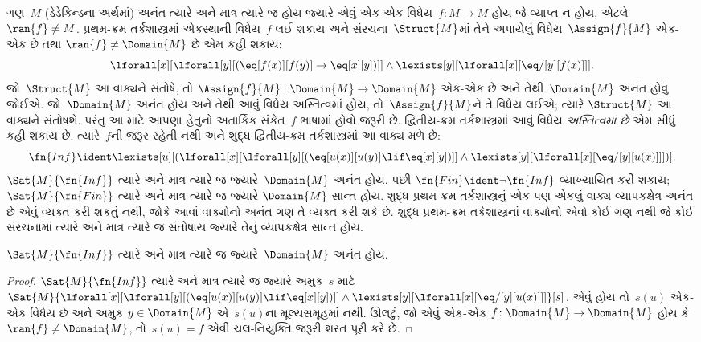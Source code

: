 ગણ~$M$ (ડેડેકિન્ડના અર્થમાં) અનંત ત્યારે અને માત્ર ત્યારે જ હોય જ્યારે
એવું એક-એક વિધેય~$f\colon M
\to M$ હોય જે વ્યાપ્ત ન હોય, એટલે $\ran{f} \neq M$. પ્રથમ-ક્રમ
તર્કશાસ્ત્રમાં એકસ્થાની વિધેય~$f$ લઈ શકાય અને
સંરચના~$\Struct{M}$માં તેને અપાયેલું વિધેય~$\Assign{f}{M}$
એક-એક છે તથા $\ran{f} \neq
\Domain{M}$ છે એમ કહી શકાય:
\[
\lforall[x][\lforall[y][(\eq[f(x)][f(y)] \to \eq[x][y])]] \land
\lexists[y][\lforall[x][\eq/[y][f(x)]]].
\]
જો~$\Struct{M}$ આ વાક્યને સંતોષે, તો
$\Assign{f}{M}:
\Domain{M} \to \Domain{M}$ એક-એક છે અને તેથી~$\Domain{M}$
અનંત હોવું જોઈએ. જો~$\Domain{M}$ અનંત હોય અને તેથી આવું વિધેય
અસ્તિત્વમાં હોય, તો~$\Assign{f}{M}$ને તે વિધેય લઈએ; ત્યારે
$\Struct{M}$ આ વાક્યને સંતોષશે. પરંતુ આ માટે આપણા હેતુનો
અતાર્કિક સંકેત~$f$ ભાષામાં હોવો જરૂરી છે. દ્વિતીય-ક્રમ તર્કશાસ્ત્રમાં
આવું વિધેય \emph{અસ્તિત્વમાં છે} એમ સીધું કહી શકાય છે. ત્યારે~$f$ની
જરૂર રહેતી નથી અને શુદ્ધ દ્વિતીય-ક્રમ તર્કશાસ્ત્રમાં આ વાક્ય
મળે છે:
\[
\fn{Inf} \ident \lexists[u][(\lforall[x][\lforall[y][(\eq[u(x)][u(y)]
      \lif \eq[x][y])]] \land \lexists[y][\lforall[x][\eq/[y][u(x)]]])].
\]
$\Sat{M}{\fn{Inf}}$ ત્યારે અને માત્ર ત્યારે જ જ્યારે~$\Domain{M}$
અનંત હોય. પછી $\fn{Fin} \ident \lnot \fn{Inf}$ વ્યાખ્યાયિત કરી
શકાય; $\Sat{M}{\fn{Fin}}$ ત્યારે અને માત્ર ત્યારે જ જ્યારે
$\Domain{M}$ સાન્ત હોય. શુદ્ધ પ્રથમ-ક્રમ તર્કશાસ્ત્રનું એક પણ એકલું
વાક્ય વ્યાપકક્ષેત્ર અનંત છે એવું વ્યક્ત કરી શકતું નથી, જોકે
આવાં વાક્યોનો અનંત ગણ તે વ્યક્ત કરી શકે છે. શુદ્ધ પ્રથમ-ક્રમ
તર્કશાસ્ત્રનાં વાક્યોનો એવો કોઈ ગણ નથી જે કોઈ
સંરચનામાં ત્યારે અને માત્ર ત્યારે જ સંતોષાય જ્યારે તેનું
વ્યાપકક્ષેત્ર સાન્ત હોય.

\begin{prop}
$\Sat{M}{\fn{Inf}}$ ત્યારે અને માત્ર ત્યારે જ જ્યારે~$\Domain{M}$
અનંત હોય.
\end{prop}

\begin{proof}
$\Sat{M}{\fn{Inf}}$ ત્યારે અને માત્ર ત્યારે જ જ્યારે અમુક~$s$
માટે
  $\Sat{M}{\lforall[x][\lforall[y][(\eq[u(x)][u(y)] \lif \eq[x][y])]]
    \land \lexists[y][\lforall[x][\eq/[y][u(x)]]]}[s]$.
  એવું હોય તો~$s(u)$ એક-એક વિધેય છે અને અમુક $y
  \in \Domain{M}$ એ~$s(u)$ના મૂલ્યસમૂહમાં નથી. ઊલટું, જો એવું
  એક-એક $f\colon \Domain{M} \to \Domain{M}$ હોય કે
  $\ran{f} \neq \Domain{M}$, તો~$s(u) = f$ એવી ચલ-નિયુક્તિ જરૂરી
  શરત પૂરી કરે છે.
\end{proof}

